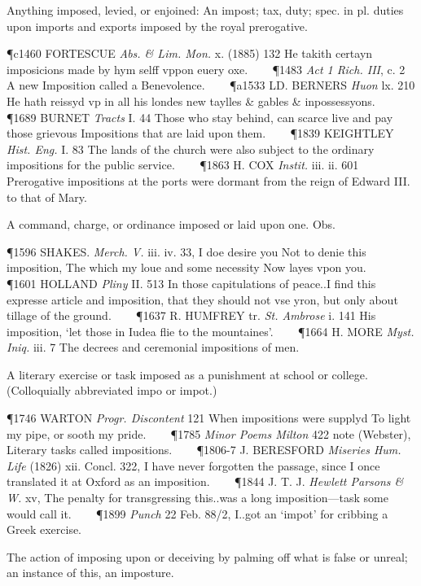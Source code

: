 \begin{description}[wide, labelwidth=!, labelindent=0pt]
\begin{myenumerate}
 Anything imposed, levied, or enjoined:  An impost; tax, duty; spec. in pl. duties upon imports and exports imposed by the royal prerogative.

\P c1460 FORTESCUE  \textit{Abs. \& Lim. Mon.} x. (1885) 132 He takith certayn imposicions made by hym selff vppon euery oxe.    
\P 1483  \textit{Act 1 Rich. III}, c. 2 A new Imposition called a Benevolence.    
\P a1533 LD. BERNERS  \textit{Huon} lx. 210 He hath reissyd vp in all his londes new taylles \& gables \& inpossessyons.    
\P 1689 BURNET  \textit{Tracts} I. 44 Those who stay behind, can scarce live and pay those grievous Impositions that are laid upon them.    
\P 1839 KEIGHTLEY  \textit{Hist. Eng.} I. 83 The lands of the church were also subject to the ordinary impositions for the public service.    
\P 1863 H. COX  \textit{Instit.} iii. ii. 601 Prerogative impositions at the ports were dormant from the reign of Edward III. to that of Mary.

 A command, charge, or ordinance imposed or laid upon one. Obs.

\P 1596 SHAKES.  \textit{Merch. V.} iii. iv. 33, I doe desire you Not to denie this imposition, The which my loue and some necessity Now layes vpon you.    
\P 1601 HOLLAND  \textit{Pliny} II. 513 In those capitulations of peace..I find this expresse article and imposition, that they should not vse yron, but only about tillage of the ground.    
\P 1637 R. HUMFREY tr.  \textit{St. Ambrose} i. 141 His imposition, ‘let those in Iudea flie to the mountaines’.    
\P 1664 H. MORE  \textit{Myst. Iniq.} iii. 7 The decrees and ceremonial impositions of men.

 A literary exercise or task imposed as a punishment at school or college. (Colloquially abbreviated impo or impot.)

\P 1746 WARTON  \textit{Progr. Discontent} 121 When impositions were supplyd To light my pipe, or sooth my pride.    
\P 1785  \textit{ Minor Poems Milton} 422 note (Webster), Literary tasks called impositions.    
\P 1806-7 J. BERESFORD  \textit{Miseries Hum. Life} (1826) xii. Concl. 322, I have never forgotten the passage, since I once translated it at Oxford as an imposition.    
\P 1844 J. T. J.  \textit{Hewlett Parsons \& W.} xv, The penalty for transgressing this..was a long imposition—task some would call it.    
\P 1899  \textit{Punch} 22 Feb. 88/2, I..got an ‘impot’ for cribbing a Greek exercise.

 The action of imposing upon or deceiving by palming off what is false or unreal; an instance of this, an imposture.


\end{myenumerate}
\end{description}
